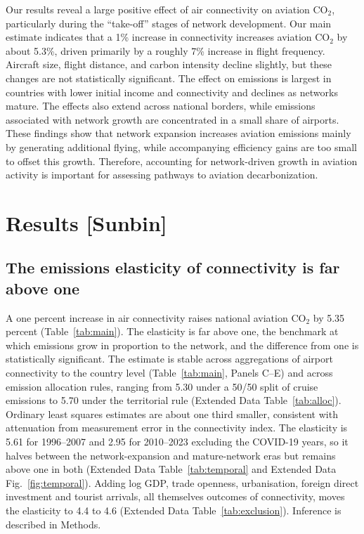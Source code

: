 \documentclass[12pt]{extarticle}
\begin{document}
Our results reveal a large positive effect of air connectivity on
aviation CO$_2$, particularly during the ``take-off'' stages of network
development. Our main estimate indicates that a 1\% increase in
connectivity increases aviation CO$_2$ by about 5.3\%, driven primarily
by a roughly 7\% increase in flight frequency. Aircraft size, flight
distance, and carbon intensity decline slightly, but these changes are
not statistically significant. The effect on emissions is largest in
countries with lower initial income and connectivity and declines as
networks mature. The effects also extend across national borders, while
emissions associated with network growth are concentrated in a small
share of airports. These findings show that network expansion increases
aviation emissions mainly by generating additional flying, while
accompanying efficiency gains are too small to offset this growth.
Therefore, accounting for network-driven growth in aviation activity is
important for assessing pathways to aviation decarbonization.

\section*{Results [Sunbin]}
\subsection*{The emissions elasticity of connectivity is far above one}
A one percent increase in air connectivity raises national aviation CO$_2$
by 5.35 percent (Table~\ref{tab:main}). The elasticity is far above one,
the benchmark at which emissions grow in proportion to the network, and
the difference from one is statistically significant. The estimate is
stable across aggregations of airport connectivity to the country level
(Table~\ref{tab:main}, Panels C--E) and across emission allocation rules,
ranging from 5.30 under a 50/50 split of cruise emissions to 5.70 under
the territorial rule (Extended Data Table~\ref{tab:alloc}). Ordinary least
squares estimates are about one third smaller, consistent with attenuation
from measurement error in the connectivity index. The elasticity is 5.61
for 1996--2007 and 2.95 for 2010--2023 excluding the COVID-19 years, so it
halves between the network-expansion and mature-network eras but remains
above one in both (Extended Data Table~\ref{tab:temporal} and Extended
Data Fig.~\ref{fig:temporal}). Adding log GDP, trade openness,
urbanisation, foreign direct investment and tourist arrivals, all
themselves outcomes of connectivity, moves the elasticity to 4.4 to 4.6
(Extended Data Table~\ref{tab:exclusion}). Inference is described in
Methods.
\end{document}

